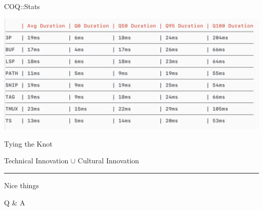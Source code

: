 \documentclass{beamer}
\begin{document}
\begin{frame}{COQ::Stats}

	\includegraphics[width=\textwidth]{stats}

\end{frame}


\begin{frame}{Tying the Knot}

	\begin{centering}

		{\Large Technical Innovation $\cup$ Cultural Innovation}

		\rule{\textwidth}{0.1em}

		{\LARGE Nice things}

	\end{centering}

\end{frame}


\begin{frame}[standout]

	Q \& A

\end{frame}
\end{document}
